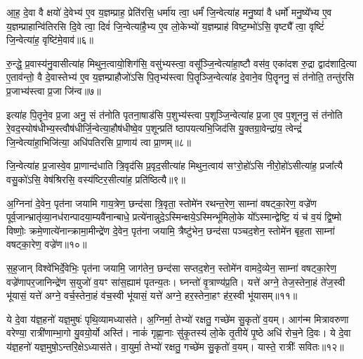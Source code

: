 आ॒ह॒ दे॒वा वै क्षयो॑ दे॒वेभ्य॑ ए॒व य॒ज्ञम्प्राह॒ प्रेति॑रसि॒ धर्मा॑य त्वा॒ धर्मं॑ जि॒न्वेत्या॑ह मनु॒ष्या॑ वै धर्मो॑ मनु॒ष्ये᳚भ्य ए॒व य॒ज्ञम्प्राहान्वि॑तिरसि दि॒वे त्वा॒ दिवं॑ जि॒न्वेत्या॑है॒भ्य ए॒व लो॒केभ्यो॑ य॒ज्ञम्प्राह॑ विष्ट॒म्भो॑\-ऽसि॒ वृष्ट्यै᳚ त्वा॒ वृष्टिं॑ जि॒न्वेत्या॑ह॒ वृष्टि॑मे॒वाव॑॥६॥

रु॒न्द्धे॒ प्र॒वास्य॑नु॒वासीत्या॑ह मिथुन॒त्वायो॒शिग॑सि॒ वसु॑भ्यस्त्वा॒ वसू᳚ञ्जि॒न्वेत्या॑हा॒ष्टौ वस॑व॒ एका॑दश रु॒द्रा द्वाद॑शादि॒त्या ए॒ताव॑न्तो॒ वै दे॒वास्तेभ्य॑ ए॒व य॒ज्ञम्प्राहौजो॑\-ऽसि पि॒तृभ्य॑स्त्वा पि॒तॄञ्जि॒न्वेत्या॑ह दे॒वाने॒व पि॒तॄननु॒ सं त॑नोति॒ तन्तु॑रसि प्र॒जाभ्य॑स्त्वा प्र॒जा जि॑न्व॥७॥

इत्या॑ह पि॒तॄने॒व प्र॒जा अनु॒ सं त॑नोति पृतना॒षाड॑सि प॒शुभ्य॑स्त्वा प॒शूञ्जि॒न्वेत्या॑ह प्र॒जा ए॒व प॒शूननु॒ सं त॑नोति रे॒वद॒स्योष॑धीभ्य॒स्त्वौष॑धीर्जि॒न्वेत्या॒हौष॑धीष्वे॒व प॒शून्प्रति॑ ष्ठापयत्यभि॒जिद॑सि यु॒क्तग्रा॒वेन्द्रा॑य॒ त्वेन्द्रं॑ जि॒न्वेत्या॑हा॒भिजि॑त्या॒ अधि॑पतिरसि प्रा॒णाय॑ त्वा प्रा॒णम्॥८॥

जि॒न्वेत्या॑ह प्र॒जास्वे॒व प्रा॒णान्द॑धाति त्रि॒वृद॑सि प्र॒वृद॒सीत्या॑ह मिथुन॒त्वाय॑ सꣳरो॒हो॑\-ऽसि नीरो॒हो॑\-ऽसीत्या॑ह॒ प्रजा᳚त्यै वसु॒को॑\-ऽसि॒ वेष॑श्रिरसि॒ वस्य॑ष्टिर॒सीत्या॑ह॒ प्रति॑ष्ठित्यै॥९॥

{\anuvakamend[{जि॒न्वेत्यव॑ प्र॒जा जि॑न्व प्रा॒णन्त्रि॒ꣳ॒शच्च॑}]}%

अ॒ग्निना॑ दे॒वेन॒ पृत॑ना जयामि गाय॒त्रेण॒ छन्द॑सा त्रि॒वृता॒ स्तोमे॑न रथन्त॒रेण॒ साम्ना॑ वषट्का॒रेण॒ वज्रे॑ण पूर्व॒जान्भ्रातृ॑व्या॒नध॑रान्पादया॒म्यवै॑नान्बाधे॒ प्रत्ये॑नान्नुदे॒\-ऽस्मिन्क्षये॒\-ऽस्मिन्भू॑मिलो॒के यो᳚\-ऽस्मान्द्वेष्टि॒ यं च॑ व॒यं द्वि॒ष्मो विष्णोः॒ क्रमे॒णात्ये॑नान्क्रामा॒मीन्द्रे॑ण दे॒वेन॒ पृत॑ना जयामि॒ त्रैष्टु॑भेन॒ छन्द॑सा पञ्चद॒शेन॒ स्तोमे॑न बृह॒ता साम्ना॑ वषट्का॒रेण॒ वज्रे॑ण॥१०॥

स॒ह॒जान् विश्वे॑भिर्दे॒वेभिः॒ पृत॑ना जयामि॒ जाग॑तेन॒ छन्द॑सा सप्तद॒शेन॒ स्तोमे॑न वामदे॒व्येन॒ साम्ना॑ वषट्का॒रेण॒ वज्रे॑णापर॒जानिन्द्रे॑ण स॒युजो॑ व॒यꣳ सा॑स॒ह्याम॑ पृतन्य॒तः। घ्नन्तो॑ वृ॒त्राण्य॑प्र॒ति। यत्ते॑ अग्ने॒ तेज॒स्तेना॒हं ते॑ज॒स्वी भू॑यासं॒ यत्ते॑ अग्ने॒ वर्च॒स्तेना॒हं व॑च॒स्वी भू॑यासं॒ यत्ते॑ अग्ने॒ हर॒स्तेना॒हꣳ ह॑र॒स्वी भू॑यासम्॥११॥

{}%

ये दे॒वा य॑ज्ञ॒हनो॑ यज्ञ॒मुषः॑ पृथि॒व्यामध्यास॑ते। अ॒ग्निर्मा॒ तेभ्यो॑ रक्षतु॒ गच्छे॑म सु॒कृतो॑ व॒यम्। आग॑न्म मित्रावरुणा वरेण्या॒ रात्री॑णाम्भा॒गो यु॒वयो॒र्यो अस्ति॑। नाकं॑ गृह्णा॒नाः सु॑कृ॒तस्य॑ लो॒के तृ॒तीये॑ पृ॒ष्ठे अधि॑ रोच॒ने दि॒वः। ये दे॒वा य॑ज्ञ॒हनो॑ यज्ञ॒मुषो॒\-ऽन्तरि॒क्षे\-ऽध्यास॑ते। वा॒युर्मा॒ तेभ्यो॑ रक्षतु॒ गच्छे॑म सु॒कृतो॑ व॒यम्। यास्ते॒ रात्रीः᳚ सवितः॥१२॥

